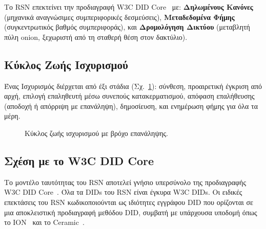 \documentclass[11pt,a4paper,twocolumn]{article}
\begin{document}
Το RSN επεκτείνει την προδιαγραφή W3C DID Core~\cite{did2022} με: \textbf{Δηλωμένους Κανόνες} (μηχανικά αναγνώσιμες συμπεριφορικές δεσμεύσεις), \textbf{Μεταδεδομένα Φήμης} (συγκεντρωτικός βαθμός συμπεριφοράς), και \textbf{Δρομολόγηση Δικτύου} (μεταβλητή πύλη onion, ξεχωριστή από τη σταθερή θέση στον δακτύλιο).

\subsection{Κύκλος Ζωής Ισχυρισμού}

Ένας Ισχυρισμός διέρχεται από έξι στάδια (Σχ.~\ref{fig:lifecycle}): σύνθεση, προαιρετική έγκριση από αρχή, επιλογή επαληθευτή μέσω συνεπούς κατακερματισμού, απόφαση επαλήθευσης (αποδοχή ή απόρριψη με επανάληψη), δημοσίευση, και ενημέρωση φήμης για όλα τα μέρη.

\begin{figure}[ht]
\centering
{}
\caption{Κύκλος ζωής ισχυρισμού με βρόχο επανάληψης.}
\label{fig:lifecycle}
\end{figure}

\subsection{Σχέση με το W3C DID Core}

Το μοντέλο ταυτότητας του RSN αποτελεί γνήσιο υπερσύνολο της προδιαγραφής W3C DID Core~\cite{did2022}. Όλα τα DIDs του RSN είναι έγκυρα W3C DIDs. Οι ειδικές επεκτάσεις του RSN κωδικοποιούνται ως ιδιότητες εγγράφου DID που ορίζονται σε μια αποκλειστική προδιαγραφή μεθόδου DID, συμβατή με υπάρχουσα υποδομή όπως το ION~\cite{buchner2021} και το Ceramic~\cite{ceramic2023}.
\end{document}
